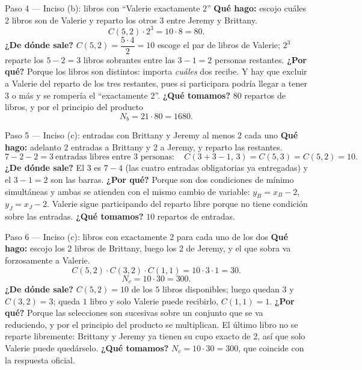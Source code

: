 \documentclass[11pt]{article}
\begin{document}
\begin{paso}{Paso 4 --- Inciso (b): libros con ``Valerie exactamente 2''}
\textbf{Qué hago:} escojo cuáles 2 libros son de Valerie y reparto los otros 3 entre Jeremy y Brittany.
\[
C(5,2)\cdot 2^3=10\cdot 8=80 .
\]
\textbf{¿De dónde sale?} $C(5,2)=\dfrac{5\cdot4}{2}=10$ escoge el par de libros de Valerie; $2^{3}$ reparte los $5-2=3$ libros sobrantes entre las $3-1=2$ personas restantes.
\textbf{¿Por qué?} Porque los libros son distintos: importa \emph{cuáles} dos recibe. Y hay que excluir a Valerie del reparto de los tres restantes, pues si participara podría llegar a tener 3 o más y se rompería el ``exactamente 2''.
\textbf{¿Qué tomamos?} $80$ repartos de libros, y por el principio del producto
\[
N_b=21\cdot 80=1680 .
\]
\end{paso}

\begin{paso}{Paso 5 --- Inciso (c): entradas con Brittany y Jeremy al menos 2 cada uno}
\textbf{Qué hago:} adelanto 2 entradas a Brittany y 2 a Jeremy, y reparto las restantes.
\[
7-2-2=3\ \text{entradas libres entre 3 personas}:\quad C(3+3-1,\,3)=C(5,3)=C(5,2)=10 .
\]
\textbf{¿De dónde sale?} El $3$ es $7-4$ (las cuatro entradas obligatorias ya entregadas) y el $3-1=2$ son las barras.
\textbf{¿Por qué?} Porque son dos condiciones de mínimo simultáneas y ambas se atienden con el mismo cambio de variable: $y_B=x_B-2$, $y_J=x_J-2$. Valerie sigue participando del reparto libre porque no tiene condición sobre las entradas.
\textbf{¿Qué tomamos?} $10$ repartos de entradas.
\end{paso}

\begin{paso}{Paso 6 --- Inciso (c): libros con exactamente 2 para cada uno de los dos}
\textbf{Qué hago:} escojo los 2 libros de Brittany, luego los 2 de Jeremy, y el que sobra va forzosamente a Valerie.
\[
C(5,2)\cdot C(3,2)\cdot C(1,1)=10\cdot 3\cdot 1=30 .
\]
\[
N_c=10\cdot 30=300 .
\]
\textbf{¿De dónde sale?} $C(5,2)=10$ de los $5$ libros disponibles; luego quedan $3$ y $C(3,2)=3$; queda $1$ libro y solo Valerie puede recibirlo, $C(1,1)=1$.
\textbf{¿Por qué?} Porque las selecciones son sucesivas sobre un conjunto que se va reduciendo, y por el principio del producto se multiplican. El último libro no se reparte libremente: Brittany y Jeremy ya tienen su cupo exacto de 2, así que solo Valerie puede quedárselo.
\textbf{¿Qué tomamos?} $N_c=10\cdot 30=300$, que coincide con la respuesta oficial.
\end{paso}
\end{document}
